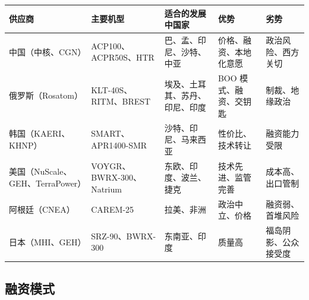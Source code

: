 \documentclass[
  UTF8,
  scheme=plain,
  fontsize=10pt,
  openany
]{ctexbook}
\begin{document}
{\def\LTcaptype{none} %
\begin{longtable}[]{@{}
  >{\raggedright\arraybackslash}p{}
  >{\raggedright\arraybackslash}p{}
  >{\raggedright\arraybackslash}p{}
  >{\raggedright\arraybackslash}p{}
  >{\raggedright\arraybackslash}p{}@{}}
\toprule\noalign{}
\begin{minipage}[b]{\linewidth}\raggedright
供应商
\end{minipage} & \begin{minipage}[b]{\linewidth}\raggedright
主要机型
\end{minipage} & \begin{minipage}[b]{\linewidth}\raggedright
适合的发展中国家
\end{minipage} & \begin{minipage}[b]{\linewidth}\raggedright
优势
\end{minipage} & \begin{minipage}[b]{\linewidth}\raggedright
劣势
\end{minipage} \\
\midrule\noalign{}
\endhead
\bottomrule\noalign{}
\endlastfoot
中国（中核、CGN） & ACP100、ACPR50S、HTR & 巴、孟、印尼、沙特、中亚 &
价格、融资、本地化意愿 & 政治风险、西方关切 \\
俄罗斯（Rosatom） & KLT-40S、RITM、BREST &
埃及、土耳其、苏丹、印尼、印度 & BOO 模式、融资、交钥匙 &
制裁、地缘政治 \\
韩国（KAERI、KHNP） & SMART、APR1400-SMR & 沙特、印尼、马来西亚 &
性价比、技术转让 & 融资能力受限 \\
美国（NuScale、GEH、TerraPower） & VOYGR、BWRX-300、Natrium &
东欧、印度、波兰、捷克 & 技术先进、监管完善 & 成本高、出口管制 \\
阿根廷（CNEA） & CAREM-25 & 拉美、非洲 & 政治中立、价格 &
融资弱、首堆风险 \\
日本（MHI、GEH） & SRZ-90、BWRX-300 & 东南亚、印度 & 质量高 &
福岛阴影、公众接受度 \\
\end{longtable}
}

\subsection{融资模式}\label{ux878dux8d44ux6a21ux5f0f}
\end{document}
